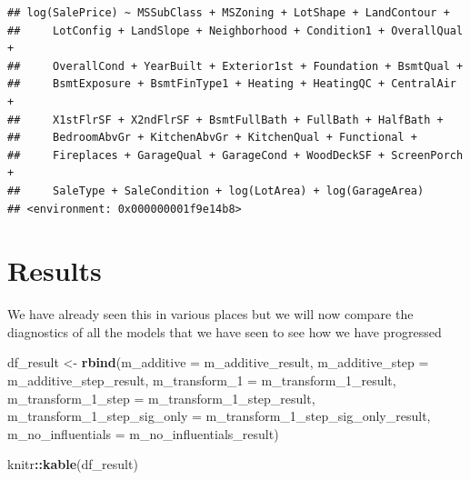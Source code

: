 \documentclass[
]{article}
\newenvironment{Shaded}{\begin{snugshade}}{\end{snugshade}}
\newcommand{\DataTypeTok}[1]{\textcolor[rgb]{0.13,0.29,0.53}{#1}}
\newcommand{\DecValTok}[1]{\textcolor[rgb]{0.00,0.00,0.81}{#1}}
\newcommand{\KeywordTok}[1]{\textcolor[rgb]{0.13,0.29,0.53}{\textbf{#1}}}
\newcommand{\NormalTok}[1]{#1}
\newcommand{\OperatorTok}[1]{\textcolor[rgb]{0.81,0.36,0.00}{\textbf{#1}}}
\newcommand{\StringTok}[1]{\textcolor[rgb]{0.31,0.60,0.02}{#1}}
\begin{document}
\begin{verbatim}
## log(SalePrice) ~ MSSubClass + MSZoning + LotShape + LandContour + 
##     LotConfig + LandSlope + Neighborhood + Condition1 + OverallQual + 
##     OverallCond + YearBuilt + Exterior1st + Foundation + BsmtQual + 
##     BsmtExposure + BsmtFinType1 + Heating + HeatingQC + CentralAir + 
##     X1stFlrSF + X2ndFlrSF + BsmtFullBath + FullBath + HalfBath + 
##     BedroomAbvGr + KitchenAbvGr + KitchenQual + Functional + 
##     Fireplaces + GarageQual + GarageCond + WoodDeckSF + ScreenPorch + 
##     SaleType + SaleCondition + log(LotArea) + log(GarageArea)
## <environment: 0x000000001f9e14b8>
\end{verbatim}

\hypertarget{results}{%
\section{Results}\label{results}}

We have already seen this in various places but we will now compare the diagnostics of all the models that we have seen to see how we have progressed

\begin{Shaded}
\begin{Highlighting}[]
\NormalTok{df_result <-}\StringTok{ }\KeywordTok{rbind}\NormalTok{(}\DataTypeTok{m_additive =}\NormalTok{ m_additive_result,}
                   \DataTypeTok{m_additive_step =}\NormalTok{ m_additive_step_result,}
                   \DataTypeTok{m_transform_1 =}\NormalTok{ m_transform_}\DecValTok{1}\NormalTok{_result,}
                   \DataTypeTok{m_transform_1_step =}\NormalTok{ m_transform_}\DecValTok{1}\NormalTok{_step_result,}
                   \DataTypeTok{m_transform_1_step_sig_only =}\NormalTok{ m_transform_}\DecValTok{1}\NormalTok{_step_sig_only_result, }
                   \DataTypeTok{m_no_influentials =}\NormalTok{ m_no_influentials_result)}

\NormalTok{knitr}\OperatorTok{::}\KeywordTok{kable}\NormalTok{(df_result)}
\end{Highlighting}
\end{Shaded}
\end{document}
